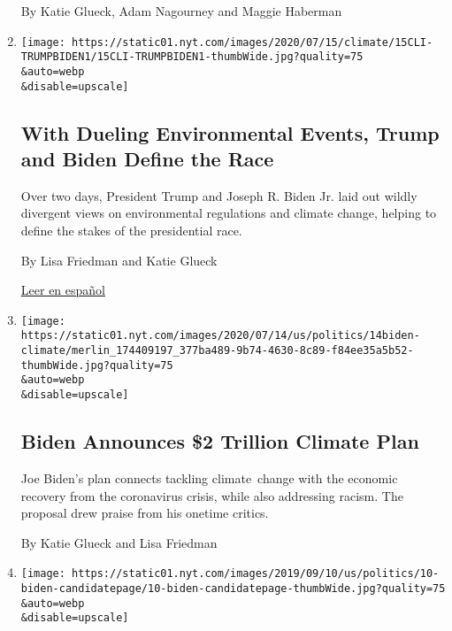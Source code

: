 \begin{enumerate}
  By Katie Glueck, Adam Nagourney and Maggie Haberman
\item
  \href{/2020/07/15/climate/trump-biden-environment.html}{}

  \texttt{[image: https://static01.nyt.com/images/2020/07/15/climate/15CLI-TRUMPBIDEN1/15CLI-TRUMPBIDEN1-thumbWide.jpg?quality=75\\\&auto=webp\\\&disable=upscale]}

  \hypertarget{with-dueling-environmental-events-trump-and-biden-define-the-race}{%
  \subsection{With Dueling Environmental Events, Trump and Biden Define
  the
  Race}\label{with-dueling-environmental-events-trump-and-biden-define-the-race}}

  Over two days, President Trump and Joseph R. Biden Jr. laid out wildly
  divergent views on environmental regulations and climate change,
  helping to define the stakes of the presidential race.

  By Lisa Friedman and Katie Glueck

  \href{https://www.nytimes.com/es/2020/07/17/espanol/estados-unidos/cambio-climatico-trump-biden.html}{Leer
  en español}
\item
  \href{/2020/07/14/us/politics/biden-climate-plan.html}{}

  \texttt{[image: https://static01.nyt.com/images/2020/07/14/us/politics/14biden-climate/merlin\_174409197\_377ba489-9b74-4630-8c89-f84ee35a5b52-thumbWide.jpg?quality=75\\\&auto=webp\\\&disable=upscale]}

  \hypertarget{biden-announces-2-trillion-climate-plan}{%
  \subsection{Biden Announces \$2 Trillion Climate
  Plan}\label{biden-announces-2-trillion-climate-plan}}

  Joe Biden's plan connects tackling climate~change with the economic
  recovery from the coronavirus crisis, while also addressing racism.
  The proposal drew praise from his onetime critics.

  By Katie Glueck and Lisa Friedman
\item
  \href{/es/interactive/2020/espanol/estados-unidos/joe-biden-elecciones.html}{}

  \texttt{[image: https://static01.nyt.com/images/2019/09/10/us/politics/10-biden-candidatepage/10-biden-candidatepage-thumbWide.jpg?quality=75\\\&auto=webp\\\&disable=upscale]}


\end{enumerate}
